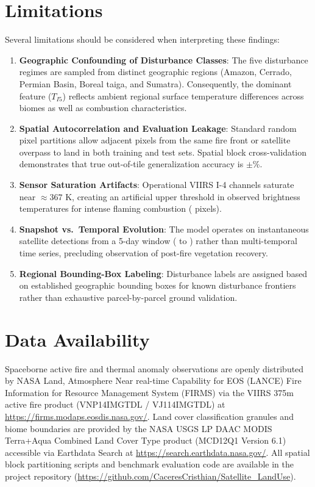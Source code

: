 \documentclass[conference]{IEEEtran}
\begin{document}
\section{Limitations}
\label{sec:limitations}
Several limitations should be considered when interpreting these findings:
\begin{enumerate}
    \item \textbf{Geographic Confounding of Disturbance Classes}: The five disturbance regimes are sampled from distinct geographic regions (Amazon, Cerrado, Permian Basin, Boreal taiga, and Sumatra). Consequently, the dominant feature ($T_{I5}$) reflects ambient regional surface temperature differences across biomes as well as combustion characteristics.
    \item \textbf{Spatial Autocorrelation and Evaluation Leakage}: Standard random pixel partitions allow adjacent pixels from the same fire front or satellite overpass to land in both training and test sets. Spatial block cross-validation demonstrates that true out-of-tile generalization accuracy is \accSpatialBlockCv{}$\pm$\accSpatialBlockCvStd{}\%.
    \item \textbf{Sensor Saturation Artifacts}: Operational VIIRS I-4 channels saturate near $\approx 367\text{ K}$, creating an artificial upper threshold in observed brightness temperatures for intense flaming combustion (\numSaturatedPixels{} pixels).
    \item \textbf{Snapshot vs.\ Temporal Evolution}: The model operates on instantaneous satellite detections from a 5-day window (\dateMin{} to \dateMax{}) rather than multi-temporal time series, precluding observation of post-fire vegetation recovery.
    \item \textbf{Regional Bounding-Box Labeling}: Disturbance labels are assigned based on established geographic bounding boxes for known disturbance frontiers rather than exhaustive parcel-by-parcel ground validation.
\end{enumerate}

\section{Data Availability}
\label{sec:data_availability}
Spaceborne active fire and thermal anomaly observations are openly distributed by NASA Land, Atmosphere Near real-time Capability for EOS (LANCE) Fire Information for Resource Management System (FIRMS) via the VIIRS 375m active fire product (VNP14IMGTDL / VJ114IMGTDL) at \url{https://firms.modaps.eosdis.nasa.gov/}. Land cover classification granules and biome boundaries are provided by the NASA USGS LP DAAC MODIS Terra+Aqua Combined Land Cover Type product (MCD12Q1 Version 6.1) accessible via Earthdata Search at \url{https://search.earthdata.nasa.gov/}. All spatial block partitioning scripts and benchmark evaluation code are available in the project repository (\url{https://github.com/CaceresCristhian/Satellite_LandUse}).
\end{document}
